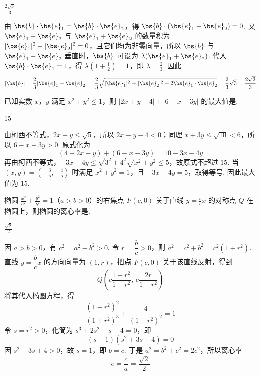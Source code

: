 \begin{answer}
\(\frac{2\sqrt{3}}{3}\)
\end{answer}

\begin{solution}
由 \(\bs{b}\cdot\bs{e}_1=\bs{b}\cdot\bs{e}_2\)，得 \(\bs{b}\cdot(\bs{e}_1-\bs{e}_2)=0\). 又 \(\bs{e}_1-\bs{e}_2\) 与 \(\bs{e}_1+\bs{e}_2\) 的数量积为 \(|\bs{e}_1|^2-|\bs{e}_2|^2=0\)，且它们均为非零向量，所以 \(\bs{b}\) 与 \(\bs{e}_1-\bs{e}_2\) 垂直时，\(\bs{b}\) 可设为 \(\lambda(\bs{e}_1+\bs{e}_2)\). 代入 \(\bs{b}\cdot\bs{e}_1=1\)，得 \(\lambda(1+\frac12)=1\)，即 \(\lambda=\frac23\). 因此
\[
|\bs{b}|=\frac23|\bs{e}_1+\bs{e}_2|=\frac23\sqrt{|\bs{e}_1|^2+|\bs{e}_2|^2+2\bs{e}_1\cdot\bs{e}_2}=\frac23\sqrt3=\frac{2\sqrt3}{3}
\]
\end{solution}

\begin{problem}
已知实数 \(x\)，\(y\) 满足 \(x^2+y^2\leqslant1\)，则 \(|2x+y-4|+|6-x-3y|\) 的最大值是\fillinblank{}.
\end{problem}

\begin{answer}
15
\end{answer}

\begin{solution}
由柯西不等式，\(2x+y\leqslant\sqrt5\)，所以 \(2x+y-4<0\)；同理 \(x+3y\leqslant\sqrt{10}<6\)，所以 \(6-x-3y>0\). 原式化为
\[
(4-2x-y)+(6-x-3y)=10-3x-4y
\]
再由柯西不等式，\(-3x-4y\leqslant\sqrt{3^2+4^2}\sqrt{x^2+y^2}\leqslant5\)，故原式不超过 \(15\). 当 \((x,y)=(-\frac35,-\frac45)\) 时满足 \(x^2+y^2=1\)，且 \(-3x-4y=5\)，取得等号. 因此最大值为 \(15\).
\end{solution}

\begin{problem}
椭圆 \(\frac{x^2}{a^2}+\frac{y^2}{b^2}=1\)（\(a>b>0\)）的右焦点 \(F(c,0)\) 关于直线 \(y=\frac{b}{c}x\) 的对称点 \(Q\) 在椭圆上，则椭圆的离心率是\fillinblank{}.
\end{problem}

\begin{answer}
\(\frac{\sqrt{2}}{2}\)
\end{answer}

\begin{solution}
因 \(a>b>0\)，有 \(c^2=a^2-b^2>0\). 令 \(r=\dfrac bc>0\)，则 \(a^2=c^2+b^2=c^2(1+r^2)\). 直线 \(y=\dfrac bc x\) 的方向向量为 \((1,r)\)，把点 \(F(c,0)\) 关于该直线反射，得到
\[
Q\left(c\frac{1-r^2}{1+r^2},\,c\frac{2r}{1+r^2}\right)
\]
将其代入椭圆方程，得
\[
\frac{(1-r^2)^2}{(1+r^2)^3}+\frac{4}{(1+r^2)^2}=1
\]
令 \(s=r^2>0\)，化简为 \(s^3+2s^2+s-4=0\)，即
\[
(s-1)(s^2+3s+4)=0
\]
因 \(s^2+3s+4>0\)，故 \(s=1\)，即 \(b=c\). 于是 \(a^2=b^2+c^2=2c^2\)，所以离心率
\[
e=\frac ca=\frac{\sqrt2}{2}
\]
\end{solution}

